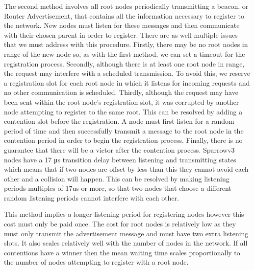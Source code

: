 The second method involves all root nodes periodically transmitting a beacon,
or Router Advertisement, that contains all the information necessary to
register to the network. New nodes must listen for these messages and then
communicate with their chosen parent in order to register.  There are as well
multiple issues that we must address with this procedure. Firstly, there may be
no root nodes in range of the new node so, as with the first method, we can set
a timeout for the registration process. Secondly, although there is at least
one root node in range, the request may interfere with a scheduled
transmission. To avoid this, we reserve a registration slot for each root node
in which it listens for incoming requests and no other communication is
scheduled. Thirdly, although the request may have been sent within the root
node's registration slot, it was corrupted by another node attempting to
register to the same root. This can be resolved by adding a contention slot
before the registration. A node must first listen for a random period of time
and then successfully transmit a message to the root node in the contention
period in order to begin the registration process. Finally, there is no
guarantee that there will be a victor after the contention process. Sparrowv3
nodes have a 17 μs transition delay between listening and transmitting states
which means that if two nodes are offset by less than this they cannot avoid
each other and a collision will happen. This can be resolved by making
listening periods multiples of 17us or more, so that two nodes that choose a
different random listening periods cannot interfere with each other.

This method implies a longer listening period for registering nodes however
this cost must only be paid once. The cost for root nodes is relatively low as
they must only transmit the advertisement message and must have two extra
listening slots. It also scales relatively well with the number of nodes in the
network.  If all contentions have a winner then the mean waiting time scales
proportionally to the number of nodes attempting to register with a root node. 

\vspace{\baselineskip}

